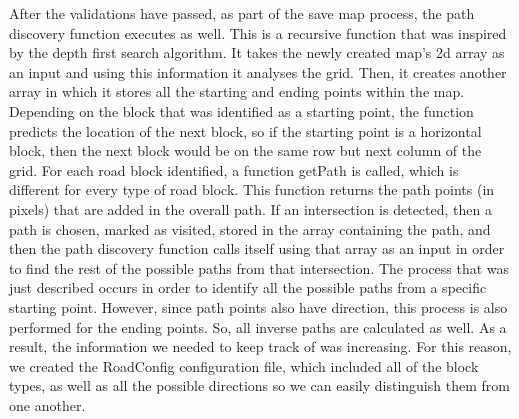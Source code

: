 \documentclass[oneside]{article}
\begin{document}
\noindent After the validations have passed, as part of the save map process, the path discovery function executes as well. This is a recursive function that was inspired by the depth first search algorithm. It takes the newly created map's 2d array as an input and using this information it analyses the grid. Then, it creates another array in which it stores all the starting and ending points within the map. Depending on the block that was identified as a starting point, the function predicts the location of the next block, so if the starting point is a horizontal block, then the next block would be on the same row but next column of the grid. For each road block identified, a function getPath is called, which is different for every type of road block. This function returns the path points (in pixels) that are added in the overall path. If an intersection is detected, then a path is chosen, marked as visited, stored in the array containing the path, and then the path discovery function calls itself using that array as an input in order to find the rest of the possible paths from that intersection. The process that was just described occurs in order to identify all the possible paths from a specific starting point. However, since path points also have direction, this process is also performed for the ending points. So, all inverse paths are calculated as well. As a result, the information we needed to keep track of was increasing. For this reason, we created the RoadConfig configuration file, which included all of the block types, as well as all the possible directions so we can easily distinguish them from one another.
\end{document}
